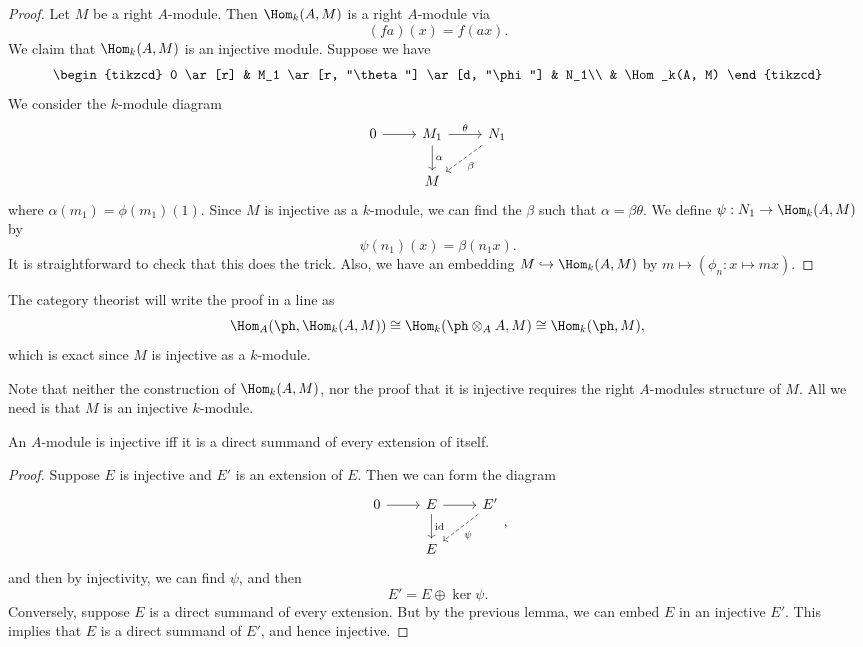 \documentclass[a4paper]{article}
\begin{document}
\begin{proof}
  Let $M$ be a right $A$-module. Then $\Hom_k(A, M)$ is a right $A$-module via
  \[
    (fa)(x) = f(ax).
  \]
  We claim that $\Hom_k(A, M)$ is an injective module. Suppose we have
  \[
    \begin{tikzcd}
      0 \ar[r] & M_1 \ar[r, "\theta"] \ar[d, "\phi"] & N_1\\
      & \Hom_k(A, M)
    \end{tikzcd}
  \]
  We consider the $k$-module diagram
  \[
    \begin{tikzcd}
      0 \ar[r] & M_1 \ar[r, "\theta"] \ar[d, "\alpha"] & N_1 \ar[ld, dashed, "\beta"]\\
      & M
    \end{tikzcd}
  \]
  where $\alpha(m_1) = \phi(m_1)(1)$. Since $M$ is injective as a $k$-module, we can find the $\beta$ such that $\alpha = \beta \theta$. We define $\psi: N_1 \to \Hom_k(A, M)$ by
  \[
    \psi(n_1)(x) = \beta(n_1 x).
  \]
  It is straightforward to check that this does the trick. Also, we have an embedding $M \hookrightarrow \Hom_k(A, M)$ by $m \mapsto (\phi_n: x \mapsto mx)$.
\end{proof}
The category theorist will write the proof in a line as
\[
  \Hom_A(\ph, \Hom_k(A, M)) \cong \Hom_k(\ph \otimes_A A , M) \cong \Hom_k(\ph, M),
\]
which is exact since $M$ is injective as a $k$-module.

Note that neither the construction of $\Hom_k(A, M)$, nor the proof that it is injective requires the right $A$-modules structure of $M$. All we need is that $M$ is an injective $k$-module.

\begin{lemma}
  An $A$-module is injective iff it is a direct summand of every extension of itself.
\end{lemma}

\begin{proof}
  Suppose $E$ is injective and $E'$ is an extension of $E$. Then we can form the diagram
  \[
    \begin{tikzcd}
      0 \ar[r] & E \ar[r] \ar[d, "\mathrm{id}"] & E' \ar[dl, dashed, "\psi"]\\
      & E
    \end{tikzcd},
  \]
  and then by injectivity, we can find $\psi$, and then
  \[
    E' = E \oplus \ker \psi.
  \]
  Conversely, suppose $E$ is a direct summand of every extension. But by the previous lemma, we can embed $E$ in an injective $E'$. This implies that $E$ is a direct summand of $E'$, and hence injective.
\end{proof}
\end{document}
